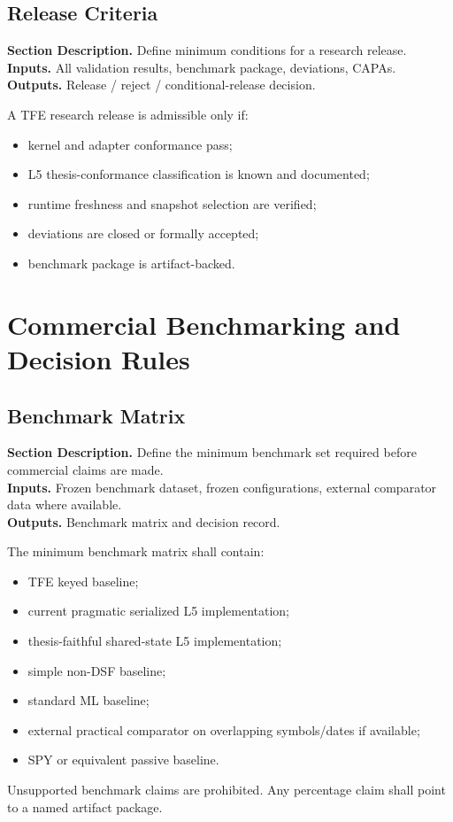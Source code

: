 \documentclass[11pt]{report}
\newcommand{\meta}[3]{\textbf{Section Description.} #1\\
\textbf{Inputs.} #2\\
\textbf{Outputs.} #3\par}
\begin{document}
\section{Release Criteria}
\meta{Define minimum conditions for a research release.}{All validation results, benchmark package, deviations, CAPAs.}{Release / reject / conditional-release decision.}

A TFE research release is admissible only if:
\begin{itemize}
    \item kernel and adapter conformance pass;
    \item L5 thesis-conformance classification is known and documented;
    \item runtime freshness and snapshot selection are verified;
    \item deviations are closed or formally accepted;
    \item benchmark package is artifact-backed.
\end{itemize}

\chapter{Commercial Benchmarking and Decision Rules}
\section{Benchmark Matrix}
\meta{Define the minimum benchmark set required before commercial claims are made.}{Frozen benchmark dataset, frozen configurations, external comparator data where available.}{Benchmark matrix and decision record.}

The minimum benchmark matrix shall contain:
\begin{itemize}
    \item TFE keyed baseline;
    \item current pragmatic serialized L5 implementation;
    \item thesis-faithful shared-state L5 implementation;
    \item simple non-DSF baseline;
    \item standard ML baseline;
    \item external practical comparator on overlapping symbols/dates if available;
    \item SPY or equivalent passive baseline.
\end{itemize}
Unsupported benchmark claims are prohibited. Any percentage claim shall point to a named artifact package.
\end{document}
